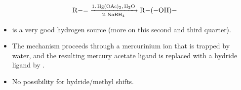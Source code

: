 \documentclass[../notes.tex]{subfiles}
\begin{document}
\begin{itemize}
    \begin{equation*}
        \ce{R-= ->[1. Hg(OAc)2, H2O][2. NaBH4] R-(-OH)-}
    \end{equation*}
    \begin{itemize}
        \item {} is a very good hydrogen source (more on this second and third quarter).
        \item The mechanism proceeds through a mercurinium ion that is trapped by water, and the resulting mercury acetate ligand is replaced with a hydride ligand by .
        \item No possibility for hydride/methyl shifts.
    \end{itemize}
\end{itemize}
\end{document}
